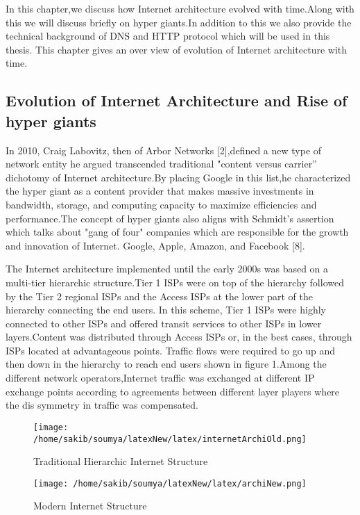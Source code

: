 In this chapter,we discuss how Internet architecture evolved with time.Along with this we will discuss briefly on hyper giants.In addition to this we also provide the technical background of DNS and HTTP protocol which will be used in this thesis.
This chapter gives an over view of evolution of Internet architecture with time. 
  
\subsection{Evolution of Internet Architecture and Rise of hyper giants}
In 2010, Craig Labovitz, then of Arbor Networks [2],defined a new type of network entity he argued transcended traditional "content versus carrier” dichotomy of Internet architecture.By placing Google in this list,he characterized the hyper giant as a content provider that makes massive investments in bandwidth, storage, and computing capacity to maximize efficiencies and performance.The concept of hyper giants also aligns with Schmidt’s assertion which talks about "gang of four" companies which are responsible for the growth and innovation of Internet. Google, Apple, Amazon, and Facebook [8].

The Internet architecture implemented until the early 2000s was based on a multi-tier hierarchic structure.Tier 1 ISPs were on top of the hierarchy followed by the Tier 2 regional ISPs and the Access ISPs at the lower part of the hierarchy connecting the end users. In this scheme, Tier 1 ISPs were highly connected to other ISPs and offered transit services to other ISPs in lower layers.Content was distributed through Access ISPs or, in the best cases, through ISPs located at advantageous points. Traffic flows were required to go up and then down in the hierarchy to reach end users shown in figure 1.Among the different network operators,Internet traffic was exchanged at different IP exchange points according to agreements between different layer players where the dis symmetry in traffic was compensated.

\begin{figure}[h]
\texttt{[image: /home/sakib/soumya/latexNew/latex/internetArchiOld.png]}
\centering
\caption{Traditional Hierarchic Internet Structure}
\end{figure}

\begin{figure}[h]
\texttt{[image: /home/sakib/soumya/latexNew/latex/archiNew.png]}
\centering
\caption{Modern Internet Structure}
\end{figure}

